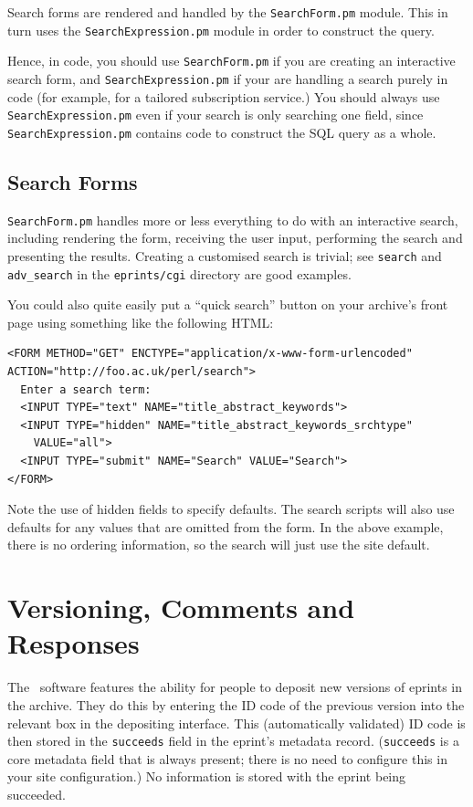Search forms are rendered and handled by the {\tt SearchForm.pm} module. This in turn uses the {\tt SearchExpression.pm} module in order to construct the query. 

Hence, in code, you should use {\tt SearchForm.pm} if you are creating an interactive search form, and {\tt SearchExpression.pm} if your are handling a search purely in code (for example, for a tailored subscription service.) You should always use {\tt SearchExpression.pm} even if your search is only searching one field, since {\tt SearchExpression.pm} contains code to construct the SQL query as a whole.



\subsection{Search Forms}

{\tt SearchForm.pm} handles more or less everything to do with an interactive search, including rendering the form, receiving the user input, performing the search and presenting the results. Creating a customised search is trivial; see {\tt search} and {\tt adv\_search} in the {\tt eprints/cgi} directory are good examples.

You could also quite easily put a ``quick search'' button on your archive's front page using something like the following HTML:

\begin{verbatim}
<FORM METHOD="GET" ENCTYPE="application/x-www-form-urlencoded"
ACTION="http://foo.ac.uk/perl/search">
  Enter a search term: 
  <INPUT TYPE="text" NAME="title_abstract_keywords">
  <INPUT TYPE="hidden" NAME="title_abstract_keywords_srchtype"
    VALUE="all">
  <INPUT TYPE="submit" NAME="Search" VALUE="Search">
</FORM>
\end{verbatim}

Note the use of hidden fields to specify defaults. The search scripts will also use defaults for any values that are omitted from the form. In the above example, there is no ordering information, so the search will just use the site default.


\section{Versioning, Comments and Responses}

The \eprints\ software features the ability for people to deposit new versions of eprints in the archive. They do this by entering the ID code of the previous version into the relevant box in the depositing interface. This (automatically validated) ID code is then stored in the {\tt succeeds} field in the eprint's metadata record. ({\tt succeeds} is a core metadata field that is always present; there is no need to configure this in your site configuration.) No information is stored with the eprint being succeeded.

